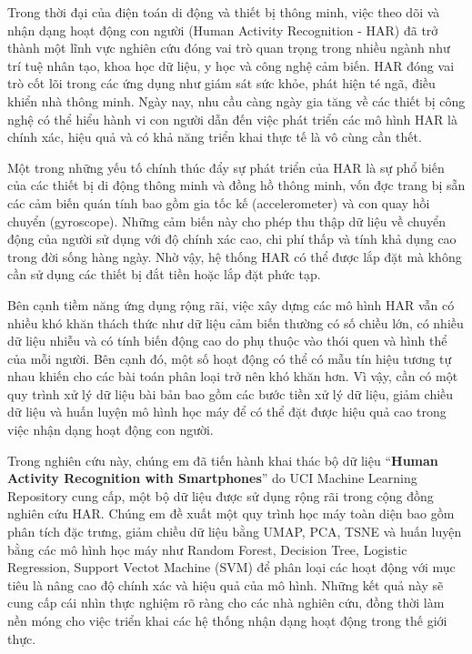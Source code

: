 \documentclass[
]{article}
\begin{document}
Trong thời đại của điện toán di động và thiết bị thông minh, việc theo
dõi và nhận dạng hoạt động con người (Human Activity Recognition - HAR)
đã trở thành một lĩnh vực nghiên cứu đóng vai trò quan trọng trong nhiều
ngành như trí tuệ nhân tạo, khoa học dữ liệu, y học và công nghệ cảm
biến. HAR đóng vai trò cốt lõi trong các ứng dụng như giám sát sức khỏe,
phát hiện té ngã, điều khiển nhà thông minh. Ngày nay, nhu cầu càng ngày
gia tăng về các thiết bị công nghệ có thể hiểu hành vi con người dẫn đến
việc phát triển các mô hình HAR là chính xác, hiệu quả và có khả năng
triển khai thực tế là vô cùng cần thết.

Một trong những yếu tố chính thúc đẩy sự phát triển của HAR là sự phổ
biến của các thiết bị di động thông minh và đồng hồ thông minh, vốn đợc
trang bị sẵn các cảm biến quán tính bao gồm gia tốc kế (accelerometer)
và con quay hồi chuyển (gyroscope). Những cảm biến này cho phép thu thập
dữ liệu về chuyển động của người sử dụng với độ chính xác cao, chi phí
thấp và tính khả dụng cao trong đời sống hàng ngày. Nhờ vậy, hệ thống
HAR có thể được lắp đặt mà không cần sử dụng các thiết bị đắt tiền hoặc
lắp đặt phức tạp.

Bên cạnh tiềm năng ứng dụng rộng rãi, việc xây dựng các mô hình HAR vẫn
có nhiều khó khăn thách thức như dữ liệu cảm biến thường có số chiều
lớn, có nhiều dữ liệu nhiễu và có tính biến động cao do phụ thuộc vào
thói quen và hình thể của mỗi người. Bên cạnh đó, một số hoạt động có
thể có mẫu tín hiệu tương tự nhau khiến cho các bài toán phân loại trở
nên khó khăn hơn. Vì vậy, cần có một quy trình xử lý dữ liệu bài bản bao
gồm các bước tiền xử lý dữ liệu, giảm chiều dữ liệu và huấn luyện mô
hình học máy để có thể đặt được hiệu quả cao trong việc nhận dạng hoạt
động con người.

Trong nghiên cứu này, chúng em đã tiến hành khai thác bộ dữ liệu
``\textbf{Human Activity Recognition with Smartphones}'' do UCI Machine
Learning Repository cung cấp, một bộ dữ liệu được sử dụng rộng rãi trong
cộng đồng nghiên cứu HAR. Chúng em đề xuất một quy trình học máy toàn
diện bao gồm phân tích đặc trưng, giảm chiều dữ liệu bằng UMAP, PCA,
TSNE và huấn luyện bằng các mô hình học máy như Random Forest, Decision
Tree, Logistic Regression, Support Vectot Machine (SVM) để phân loại các
hoạt động với mục tiêu là nâng cao độ chính xác và hiệu quả của mô hình.
Những kết quả này sẽ cung cấp cái nhìn thực nghiệm rõ ràng cho các nhà
nghiên cứu, đồng thời làm nền móng cho việc triển khai các hệ thống nhận
dạng hoạt động trong thế giới thực.
\end{document}
